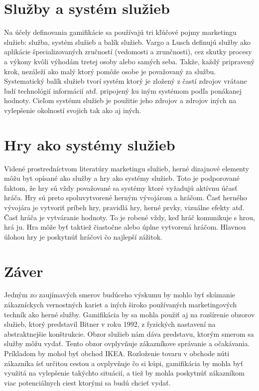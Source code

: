 \documentclass[10pt,twoside,slovak,a4paper]{article}
\begin{document}
\section{Služby a systém služieb} \label{dolezita}
Na účely definovania gamifikácie sa používajú tri kľúčové pojmy
marketingu služieb: služba, systém služieb a
balík služieb.
Vargo a Lusch definujú služby ako aplikácie špecializovaných zručností (vedomosti a zrunčnosti), cez skutky procesy a výkony kvôli výhodám tretej osoby alebo samých seba. Takže, každý pripravený krok, nezáleží ako malý ktorý pomôže osobe je považovaný za službu. Systematický balík služieb tvorí systém ktorý je zložený z častí zdrojov vrátane ľudí technológií informácií atď. pripojený ku iným systémom podľa ponákanej hodnoty. Cieľom systému služieb je použitie jeho zdrojov a zdrojov iných na vylepšenie okolností svojich tak ako aj iných. 



\section{Hry ako systémy služieb} \label{dolezitejsia}
Videné prostredníctvom literatúry marketingu služieb, herné dizajnové elementy môžu byt opísané ako služby a hry ako systémy služieb. Toto je podporované faktom, že hry sú vždy považované sa systémy ktoré vyžadujú aktívnu účasť hráča. Hry sú preto spoluvytvorené herným vývojárom a hráčom. Časť herného vývojára je vytvoriť príbeh hry, pravidlá hry, herné prvky, vizuálne efekty atď. Časť hráča je vytváranie hodnoty. To je robené vždy, keď hráč komunikuje s hrou, hrá ju. Hra môže byť taktiež čiastočne alebo úplne vytvorená hráčom. Hlavnou úlohou hry je poskytnúť hráčovi čo najlepší zážitok.


\section{Záver} \label{zaver} %
Jedným zo zaujímavých smerov budúceho výskumu by mohlo byť skúmanie
zákazníckych vernostných kariet a iných široko používaných marketingových techník
ako herné služby. Gamifikácia by sa mohla použiť aj
na rozšírenie obzorov služieb, ktorý predstavil Bitner v roku 1992,
z fyzických nastavení na abstraktnejšie konštrukcie. Obzor služieb nám dáva predstavu, ktorým smerom sa služby môžu vydať. Tento obzor ovplyvňuje zákazníkove správanie a očakávania. Príkladom by mohol byť obchod IKEA. Rozloženie tovaru v obchode núti zákazníka ísť určitou cestou a ovplyvňuje čo si kúpi, gamifikácia by mohla byť využitá na vylepšenie takýchto situácií, a tiež by mohla poskytnúť zákazníkom viac potenciálnych ciest ktorými sa budú chcieť vydať.



\end{document}

